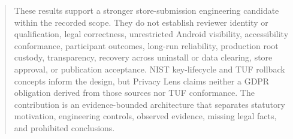\documentclass[11pt,a4paper]{article}
\begin{document}
\begin{abstract}
These results support a stronger store-submission engineering candidate within the recorded scope. They do not establish reviewer identity or qualification, legal correctness, unrestricted Android visibility, accessibility conformance, participant outcomes, long-run reliability, production root custody, transparency, recovery across uninstall or data clearing, store approval, or publication acceptance. NIST key-lifecycle and TUF rollback concepts inform the design, but Privacy Lens claims neither a GDPR obligation derived from those sources nor TUF conformance. The contribution is an evidence-bounded architecture that separates statutory motivation, engineering controls, observed evidence, missing legal facts, and prohibited conclusions.
\end{abstract}
\newpage
\tableofcontents
\newpage







{\small


}
\end{document}
